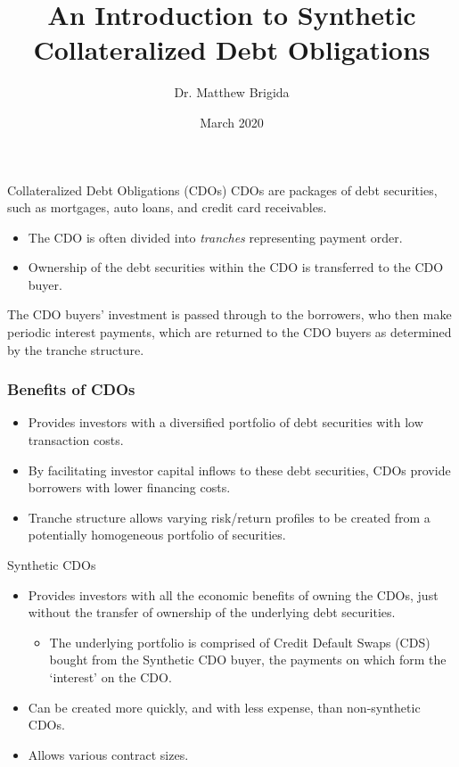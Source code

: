 \documentclass[xcolor=dvipsnames]{beamer}
\title[Synthetic CDOs]{An Introduction to Synthetic Collateralized Debt Obligations}
\author{Dr. Matthew Brigida}
\institute{
	Department of Accounting and Finance \\
	College of Business Administration \\
	SUNY Polytechnic Institute  \\
	Utica, NY \\
	\texttt{matthew.brigida@sunypoly.edu}
}
\date{March 2020}
\begin{document}
\begin{frame}[plain]
\titlepage
\end{frame}

%
%

\begin{frame}{Collateralized Debt Obligations (CDOs)}
CDOs are packages of debt securities, such as mortgages, auto loans, and credit card receivables.  
\begin{itemize}
\item The CDO is often divided into {\it tranches} representing payment order.  
\item Ownership of the debt securities within the CDO is transferred to the CDO buyer.  
\end{itemize}
The CDO buyers' investment is passed through to the borrowers, who then make periodic interest payments, which are returned to the CDO buyers as determined by the tranche structure.
\end{frame}
\begin{frame}
  \frametitle{Benefits of CDOs}
  \begin{itemize}
  \item Provides investors with a diversified portfolio of debt securities with low transaction costs. 
  \item By facilitating investor capital inflows to these debt securities, CDOs provide borrowers with lower financing costs.
  \item Tranche structure allows varying risk/return profiles to be created from a potentially homogeneous portfolio of securities.
  \end{itemize}
\end{frame}
\begin{frame}{Synthetic CDOs}
\begin{itemize}
\item Provides investors with all the economic benefits of owning the CDOs, just without the transfer of ownership of the underlying debt securities.
\begin{itemize}
\item  The underlying portfolio is comprised of Credit Default Swaps (CDS) bought from the Synthetic CDO buyer, the payments on which form the `interest' on the CDO.
\end{itemize}
\item Can be created more quickly, and with less expense, than non-synthetic CDOs.
\item Allows various contract sizes.
\end{itemize}
\end{frame}
\end{document}
